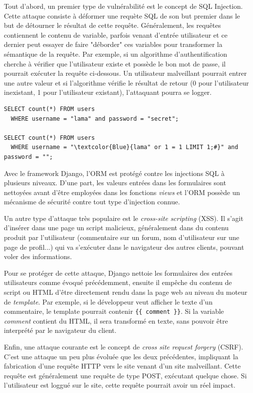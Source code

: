 \documentclass[a4paper,12pt]{article}
\begin{document}
Tout d'abord, un premier type de vulnérabilité est le concept de SQL Injection. Cette attaque
consiste à déformer une requète SQL de son but premier dans le but de détourner
le résultat de cette requête. Généralement, les requêtes contiennent le contenu
de variable, parfois venant d'entrée utilisateur et ce dernier peut essayer
de faire "déborder" ces variables pour transformer la sémantique de la requête. Par
exemple, si un algorithme d'authentification cherche à vérifier que l'utilisateur existe
et possède le bon mot de passe, il pourrait exécuter la requête ci-dessous.
Un utilisateur malveillant pourrait entrer une autre valeur et si l'algorithme
vérifie le résultat de retour (0 pour l'utilisateur inexistant, 1 pour l'utilisateur
existant), l'attaquant pourra se logger.	

\begin{Verbatim}
SELECT count(*) FROM users
  WHERE username = "lama" and password = "secret";

SELECT count(*) FROM users
  WHERE username = "\textcolor{Blue}{lama" or 1 = 1 LIMIT 1;#}" and password = "";
\end{Verbatim}

Avec le framework Django, l'ORM est protégé contre les injections SQL à plusieurs
niveaux. D'une part, les valeurs entrées dans les formulaires sont nettoyées avant
d'être employées dans les fonctions \textit{views} et l'ORM possède un mécanisme
de sécurité contre tout type d'injection connue.

Un autre type d'attaque très populaire est le \textit{cross-site scripting} (XSS).
Il s'agit d'insérer dans une page un script malicieux, généralement dans du contenu
produit par l'utilisateur (commentaire sur un forum, nom d'utilisateur sur une page de profil...)
qui va s'exécuter dans le navigateur des autres clients, pouvant voler des informations.

Pour se protéger de cette attaque, Django nettoie les formulaires des entrées utilisateurs
comme évoqué précédemment, ensuite il empêche du contenu de script ou HTML d'être directement
rendu dans la page web au niveau du moteur de \textit{template}. Par exemple,
si le développeur veut afficher le texte d'un commentaire, le template pourrait contenir
\texttt{\{\{ comment \}\}}. Si la variable \textit{comment} contient du HTML,
il sera transformé en texte, sans pouvoir être interprété par le navigateur du client.

Enfin, une attaque courante est le concept de \textit{cross site request forgery} (CSRF).
C'est une attaque un peu plus évoluée que les deux précédentes, impliquant la fabrication
d'une requête HTTP vers le site venant d'un site malveillant. Cette requête est généralement
une requête de type POST, exécutant quelque chose. Si l'utilisateur est loggué sur le site,
cette requête pourrait avoir un réel impact.
\end{document}

